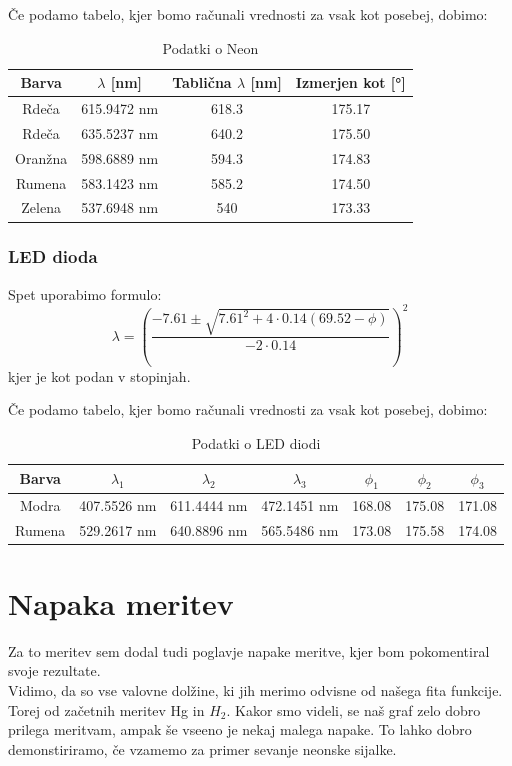 \documentclass[11pt, a4paper]{article}
\theoremstyle{definition}
\theoremstyle{example}
\theoremstyle{izrek}
\begin{document}
Če podamo tabelo, kjer bomo računali vrednosti za vsak kot posebej, dobimo:
\begin{table}[H]
	\centering
	\begin{tabular}{|c|c|c|c|}
		\hline
		Barva &  $\lambda$ [nm]& Tablična $\lambda$ [nm]& Izmerjen kot [°] \\
		\hline
		\hline
		Rdeča & 615.9472 nm & 618.3 & 175.17 \\ 
		\hline
 		Rdeča & 635.5237 nm & 640.2 & 175.50 \\ 
		\hline
 		Oranžna & 598.6889 nm & 594.3 & 174.83 \\ 
		\hline
 		Rumena & 583.1423 nm & 585.2 & 174.50 \\ 
		\hline
 		Zelena & 537.6948 nm & 540 & 173.33 \\ 
		\hline
		\hline
	\end{tabular}
	\caption{Podatki o Neon}	
\end{table}

\subsubsection{LED dioda}
Spet uporabimo formulo:
$$\lambda=\left(\frac{-7.61 \pm\sqrt{7.61^2+4 \cdot 0.14(69.52-\phi)}}{-2 \cdot 0.14}\right)^2$$
kjer je kot podan v stopinjah.

Če podamo tabelo, kjer bomo računali vrednosti za vsak kot posebej, dobimo:
\begin{table}[H]
	\centering
	\begin{tabular}{|c|c|c|c|c|c|c|}
		\hline
		Barva & $\lambda_1$ & $\lambda_2$ & $\lambda_3$ & $\phi_1$ & $\phi_2$ & $\phi_3$ \\ 
		\hline
		\hline
 Modra & 407.5526 nm & 611.4444 nm & 472.1451 nm & 168.08 & 175.08 & 171.08 \\ 
\hline
 Rumena & 529.2617 nm & 640.8896 nm & 565.5486 nm & 173.08 & 175.58 & 174.08 \\ 
\hline 
\hline
		\hline
	\end{tabular}
	\caption{Podatki o LED diodi}	
\end{table}
\pagebreak
\section{Napaka meritev}

Za to meritev sem dodal tudi poglavje napake meritve, kjer bom pokomentiral svoje rezultate.\\
\bigskip
Vidimo, da so vse valovne dolžine, ki jih merimo odvisne od našega fita funkcije. Torej od začetnih meritev Hg in $H_2$. Kakor smo videli, se naš graf zelo dobro prilega meritvam, ampak še vseeno je nekaj malega napake. To lahko dobro demonstiriramo, če vzamemo za primer sevanje neonske sijalke.
\end{document}
